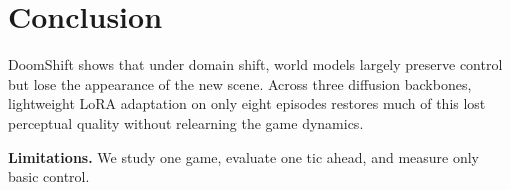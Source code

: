 \documentclass{article}
\newif\ifdraftmarks \draftmarksfalse
\newif\ifwithappendix \withappendixfalse %
\newcommand{\tbd}{\ifdraftmarks\textcolor[rgb]{0,0.3,0.75}{[tbd]}\else[tbd]\fi}
\begin{document}
\section{Conclusion}
\label{sec:limits}

DoomShift shows that under domain shift, world models largely preserve control but lose the appearance of the new scene. Across three diffusion backbones, lightweight LoRA adaptation on only eight episodes restores much of this lost perceptual quality without relearning the game dynamics.

\textbf{Limitations.} We study one game, evaluate one tic ahead, and measure only basic control.
\label{body-end}


\clearpage
\acknowledgments{\tbd}

{\sloppy}

\ifwithappendix
\clearpage
\appendix

\fi
\end{document}
